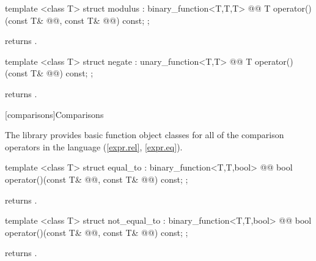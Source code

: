 \documentclass[american,twoside]{book}
\begin{document}
%
\begin{itemdecl}
template <class T> struct modulus : binary_function<T,T,T> {
  @@
    T operator()(const T& @@, const T& @@) const;
};
\end{itemdecl}

\begin{itemdescr}
\pnum
{} returns .
\end{itemdescr}

%
\begin{itemdecl}
template <class T> struct negate : unary_function<T,T> {
  @@
    T operator()(const T& @@) const;
};
\end{itemdecl}

\begin{itemdescr}
\pnum
{} returns .
\end{itemdescr}

[comparisons]{Comparisons}

\pnum
The library provides basic function object classes for all of the comparison
operators in the language (\ref{expr.rel}, \ref{expr.eq}).

%
\begin{itemdecl}
template <class T> struct equal_to : binary_function<T,T,bool> {
  @@
    bool operator()(const T& @@, const T& @@) const;
};
\end{itemdecl}

\begin{itemdescr}
\pnum
{} returns .
\end{itemdescr}

%
\begin{itemdecl}
template <class T> struct not_equal_to : binary_function<T,T,bool> {
  @@
    bool operator()(const T& @@, const T& @@) const;
};
\end{itemdecl}

\begin{itemdescr}
\pnum
{} returns .
\end{itemdescr}
\end{document}
